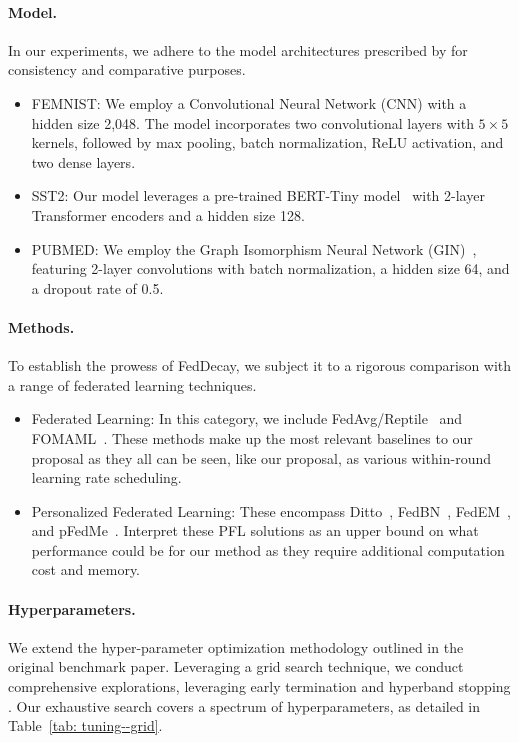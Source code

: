 \paragraph{Model.} 
In our experiments, we adhere to the model architectures prescribed by \citet{pfl-bench} for consistency and comparative purposes. 
\begin{itemize}
    \item FEMNIST: We employ a Convolutional Neural Network (CNN) with a hidden size 2,048.
    The model incorporates two convolutional layers with $5 \times 5$ kernels, followed by max pooling, batch normalization, ReLU activation, and two dense layers.
    \item SST2: Our model leverages a pre-trained BERT-Tiny model~\citep{model-sst2} with 2-layer Transformer encoders and a hidden size 128.
    \item PUBMED: We employ the Graph Isomorphism Neural Network (GIN)~\citep{model-pubmed}, featuring 2-layer convolutions with batch normalization, a hidden size 64, and a dropout rate of 0.5.
\end{itemize}

\paragraph{Methods.} To establish the prowess of FedDecay, we subject it to a rigorous comparison with a range of federated learning techniques.
\begin{itemize}
    \item Federated Learning: In this category, we include FedAvg/Reptile~\citep{fedavg, reptile} and FOMAML~\citep{reptile}. 
    These methods make up the most relevant baselines to our proposal as they all can be seen, like our proposal, as various within-round learning rate scheduling.
    \item Personalized Federated Learning: These encompass Ditto~\citep{ditto}, FedBN~\citep{fedbn}, FedEM~\citep{fedem}, and pFedMe~\citep{pfedme}.
    Interpret these PFL solutions as an upper bound on what performance could be for our method as they require additional computation cost and memory.
\end{itemize}

\paragraph{Hyperparameters.} 
We extend the hyper-parameter optimization methodology outlined in the original benchmark paper.
Leveraging a grid search technique, we conduct comprehensive explorations, leveraging early termination and hyperband stopping \citep{wandb}.
Our exhaustive search covers a spectrum of hyperparameters, as detailed in Table~\ref{tab: tuning--grid}.


